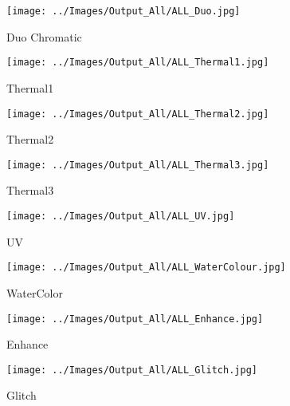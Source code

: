 \begin{figure}[h]
	\caption{Duo Chromatic}
	\centering
	\texttt{[image: ../Images/Output\_All/ALL\_Duo.jpg]}
	\label{ALLDuo}
\end{figure}

\begin{figure}[h]
	\caption{Thermal1}
	\centering
	\texttt{[image: ../Images/Output\_All/ALL\_Thermal1.jpg]}
	\label{ALLThermal1}
\end{figure}

\begin{figure}[h]
	\caption{Thermal2}
	\centering
	\texttt{[image: ../Images/Output\_All/ALL\_Thermal2.jpg]}
	\label{ALLThermal2}
\end{figure}

\begin{figure}[h]
	\caption{Thermal3}
	\centering
	\texttt{[image: ../Images/Output\_All/ALL\_Thermal3.jpg]}
	\label{ALLThermal3}
\end{figure}

\begin{figure}[h]
	\caption{UV}
	\centering
	\texttt{[image: ../Images/Output\_All/ALL\_UV.jpg]}
	\label{ALLUV}
\end{figure}

\begin{figure}[h]
	\caption{WaterColor}
	\centering
	\texttt{[image: ../Images/Output\_All/ALL\_WaterColour.jpg]}
	\label{ALLWaterColor}
\end{figure}

\begin{figure}[h]
	\caption{Enhance}
	\centering
	\texttt{[image: ../Images/Output\_All/ALL\_Enhance.jpg]}
	\label{ALLEnhance}
\end{figure}

\begin{figure}[h]
	\caption{Glitch}
	\centering
	\texttt{[image: ../Images/Output\_All/ALL\_Glitch.jpg]}
	\label{ALLGlitch}
\end{figure}